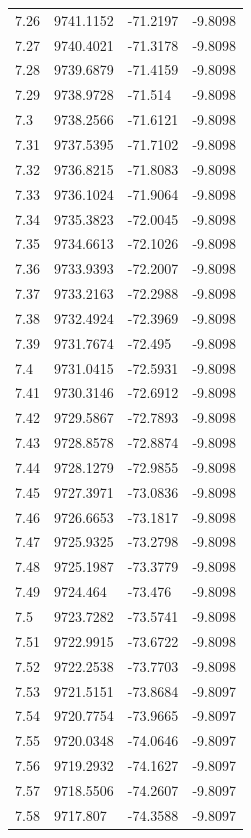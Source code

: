 \begin{table}[H]
\begin{tabular}{llll}
7.26 & 9741.1152 & -71.2197 & -9.8098 \\
7.27 & 9740.4021 & -71.3178 & -9.8098 \\
7.28 & 9739.6879 & -71.4159 & -9.8098 \\
7.29 & 9738.9728 & -71.514 & -9.8098 \\
7.3 & 9738.2566 & -71.6121 & -9.8098 \\
7.31 & 9737.5395 & -71.7102 & -9.8098 \\
7.32 & 9736.8215 & -71.8083 & -9.8098 \\
7.33 & 9736.1024 & -71.9064 & -9.8098 \\
7.34 & 9735.3823 & -72.0045 & -9.8098 \\
7.35 & 9734.6613 & -72.1026 & -9.8098 \\
7.36 & 9733.9393 & -72.2007 & -9.8098 \\
7.37 & 9733.2163 & -72.2988 & -9.8098 \\
7.38 & 9732.4924 & -72.3969 & -9.8098 \\
7.39 & 9731.7674 & -72.495 & -9.8098 \\
7.4 & 9731.0415 & -72.5931 & -9.8098 \\
7.41 & 9730.3146 & -72.6912 & -9.8098 \\
7.42 & 9729.5867 & -72.7893 & -9.8098 \\
7.43 & 9728.8578 & -72.8874 & -9.8098 \\
7.44 & 9728.1279 & -72.9855 & -9.8098 \\
7.45 & 9727.3971 & -73.0836 & -9.8098 \\
7.46 & 9726.6653 & -73.1817 & -9.8098 \\
7.47 & 9725.9325 & -73.2798 & -9.8098 \\
7.48 & 9725.1987 & -73.3779 & -9.8098 \\
7.49 & 9724.464 & -73.476 & -9.8098 \\
7.5 & 9723.7282 & -73.5741 & -9.8098 \\
7.51 & 9722.9915 & -73.6722 & -9.8098 \\
7.52 & 9722.2538 & -73.7703 & -9.8098 \\
7.53 & 9721.5151 & -73.8684 & -9.8097 \\
7.54 & 9720.7754 & -73.9665 & -9.8097 \\
7.55 & 9720.0348 & -74.0646 & -9.8097 \\
7.56 & 9719.2932 & -74.1627 & -9.8097 \\
7.57 & 9718.5506 & -74.2607 & -9.8097 \\
7.58 & 9717.807 & -74.3588 & -9.8097 \\

\end{tabular}
\end{table}
